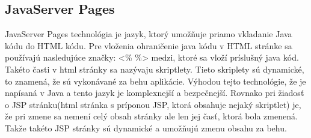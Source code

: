 \subsection{JavaServer Pages}
JavaServer Pages technológia je jazyk, ktorý umožňuje priamo vkladanie Java kódu do HTML kódu. Pre vloženia ohraničenie java kódu v HTML stránke sa používajú nasledujúce značky: <\% \%> medzi, ktoré sa vloží príslušný java kód. Takéto časti v html stránky sa nazývaju skriptlety. Tieto skriplety sú dynamické, to znamená, že sú vykonávané za behu aplikácie. Výhodou tejto technológie, že je napísaná v Java a tento jazyk je komplexnejší a bezpečnejší. Rovnako pri žiadosť o JSP stránku(html stránka s príponou JSP, ktorá obsahuje nejaký skriptlet) je, že pri zmene sa nemení celý obsah stránky ale len jej časť, ktorá bola zmenená. Takže takéto JSP stránky sú dynamické a umožňujú zmenu obsahu za behu.

